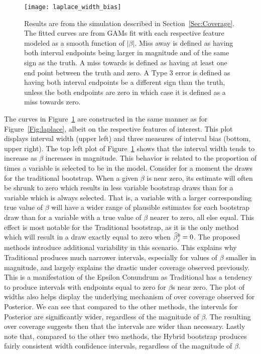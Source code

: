 \begin{figure}[hbtp]
  \begin{center}
  \texttt{[image: laplace\_width\_bias]}
  \caption{\label{Fig:laplace_width_bias} Results are from the simulation described in Section~\ref{Sec:Coverage}. The fitted curves are from GAMs fit with each respective feature modeled as a smooth function of $|\beta|$. Miss away is defined as having both interval endpoints being larger in magnitude and of the same sign as the truth. A miss towards is defined as having at least one end point between the truth and zero. A Type 3 error is defined as having both interval endpoints be a different sign than the truth, unless the both endpoints are zero in which case it is defined as a miss towards zero.}
  \end{center}
\end{figure}

The curves in Figure~\ref{Fig:laplace_width_bias} are constructed in the same manner as for Figure~\ref{Fig:laplace}, albeit on the respective features of interest. This plot displays interval width (upper left) and three measures of interval bias (bottom, upper right). The top left plot of Figure~\ref{Fig:laplace_width_bias} shows that the interval width tends to increase as $\beta$ increases in magnitude. This behavior is related to the proportion of times a variable is selected to be in the model. Consider for a moment the draws for the traditional bootstrap. When a given $\beta$ is near zero, its estimate will often be shrunk to zero which results in less variable bootstrap draws than for a variable which is always selected. That is, a variable with a larger corresponding true value of $\beta$ will have a wider range of plausible estimates for each bootstrap draw than for a variable with a true value of $\beta$ nearer to zero, all else equal. This effect is most notable for the Traditional bootstrap, as it is the only method which will result in a draw exactly equal to zero when $\widehat{\beta}^b_j = 0$. The proposed methods introduce additional variability in this scenario. This explains why Traditional produces much narrower intervals, especially for values of $\beta$ smaller in magnitude, and largely explains the drastic under coverage observed previously. This is a manifestation of the Epsilon Conundrum as Traditional has a tendency to produce intervals with endpoints equal to zero for $\beta$s near zero. The plot of widths also helps display the underlying mechanism of over coverage observed for Posterior. We can see that compared to the other methods, the intervals for Posterior are significantly wider, regardless of the magnitude of $\beta$. The resulting over coverage suggests then that the intervals are wider than necessary. Lastly note that, compared to the other two methods, the Hybrid bootstrap produces fairly consistent width confidence intervals, regardless of the magnitude of $\beta$.

